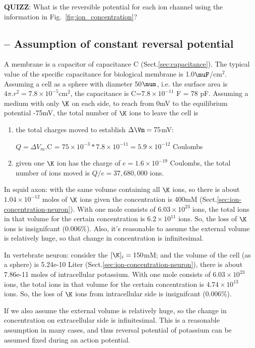 {\bf QUIZZ}: What is the reversible potential for each ion channel
using the information in Fig.~\ref{fig:ion_concentration}?

\subsection{-- Assumption of constant reversal potential}

A membrane is a capacitor of capacitance C (Sect.\ref{sec:capacitance}). The
typical value of the specific capacitance for biological membrane is
1.0$\muF$/cm$^2$. Assuming a cell as a sphere with diameter 50$\mum$, i.e. the
surface area is $4\pi.r^2=7.8\times 10^{-5}$cm$^2$, the capacitance is
C=$7.8\times 10^{-11}$ F = 78 pF.  Assuming a medium with only $\K$ on each
side, to reach from 0mV to the equilibrium potential -75mV, the total number of $\K$ ions
to leave the cell is
\begin{enumerate}
  \item the total charges moved to establish $\Delta \Vm=75$mV: 
  
  $Q=\Delta V_m$.C = $75\times10^{-3} * 7.8\times10^{-11}=5.9\times 10^{-12}$
  Coulombs
  
  \item given one $\K$ ion has the charge of $e=1.6\times 10^{-19}$ Coulombs,
  the total number of ions moved is $Q/e = 37,680,000$ ions.
\end{enumerate}

In squid axon: with the same volume containing all $\K$ ions, so there is about
$1.04\times 10^{-12}$ moles of $\K$ ions given the concentration is 400mM
(Sect.\ref{sec:ion-concentration-neuron}).
With one mole consists of $6.03\times 10^{23}$ ions, the total ions in that volume
for the certain concentration is $6.2\times 10^{11}$ ions. So, the loss of $\K$
ions is insignifcant (0.006\%). Also, it's reasonable to assume the external
volume is relatively huge, so that change in concentration is infinitesimal.

In vertebrate neuron: consider the $[\K]_i = 150$mM; and the volume of the cell
(as a sphere) is 5.24e-10 Liter (Sect.\ref{sec:ion-concentration-neuron}), there
is about 7.86e-11 moles of intracellular potassium.
With one mole consists of $6.03\times 10^{23}$ ions, the total ions in that
volume for the certain concentration is $4.74\times 10^{13}$ ions. So, the loss
of $\K$ ions from intracellular side is insignifcant (0.006\%).

If we also assume the external volume is relatively huge, so the change in
concentration on extracellular side is infinitesimal. This is a 
reasonable assumption in many cases, and thus reversal potential of potassium
can be assumed fixed during an action potential.



